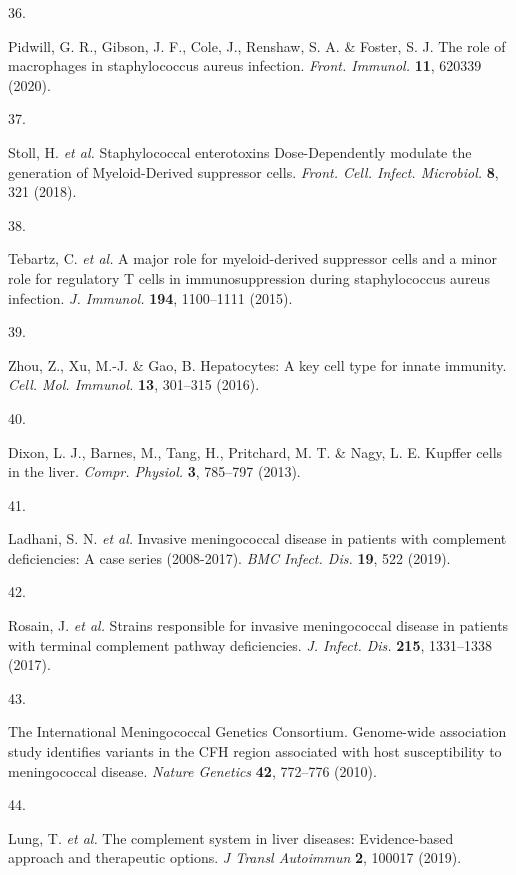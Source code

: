 \documentclass[
]{report}
\newlength{\cslhangindent}
\newlength{\csllabelwidth}
\newenvironment{CSLReferences}[2] %
 {\begin{list}{}{%
  \setlength{\itemindent}{0pt}
  \setlength{\leftmargin}{0pt}
  \setlength{\parsep}{0pt}
  \ifodd #1
   \setlength{\leftmargin}{\cslhangindent}
   \setlength{\itemindent}{-1\cslhangindent}
  \fi
  \setlength{\itemsep}{#2\baselineskip}}}
 {\end{list}}
\newcommand{\CSLLeftMargin}[1]{\parbox[t]{\csllabelwidth}{\strut#1\strut}}
\newcommand{\CSLRightInline}[1]{\parbox[t]{\linewidth - \csllabelwidth}{\strut#1\strut}}
\begin{document}
\begin{CSLReferences}{0}{0}
\CSLLeftMargin{36. }%
\CSLRightInline{Pidwill, G. R., Gibson, J. F., Cole, J., Renshaw, S. A.
\& Foster, S. J. The role of macrophages in staphylococcus aureus
infection. \emph{Front. Immunol.} \textbf{11}, 620339 (2020).}

\CSLLeftMargin{37. }%
\CSLRightInline{Stoll, H. \emph{et al.} Staphylococcal enterotoxins
{Dose-Dependently} modulate the generation of {Myeloid-Derived}
suppressor cells. \emph{Front. Cell. Infect. Microbiol.} \textbf{8}, 321
(2018).}

\CSLLeftMargin{38. }%
\CSLRightInline{Tebartz, C. \emph{et al.} A major role for
myeloid-derived suppressor cells and a minor role for regulatory {T}
cells in immunosuppression during staphylococcus aureus infection.
\emph{J. Immunol.} \textbf{194}, 1100--1111 (2015).}

\CSLLeftMargin{39. }%
\CSLRightInline{Zhou, Z., Xu, M.-J. \& Gao, B. Hepatocytes: A key cell
type for innate immunity. \emph{Cell. Mol. Immunol.} \textbf{13},
301--315 (2016).}

\CSLLeftMargin{40. }%
\CSLRightInline{Dixon, L. J., Barnes, M., Tang, H., Pritchard, M. T. \&
Nagy, L. E. Kupffer cells in the liver. \emph{Compr. Physiol.}
\textbf{3}, 785--797 (2013).}

\CSLLeftMargin{41. }%
\CSLRightInline{Ladhani, S. N. \emph{et al.} Invasive meningococcal
disease in patients with complement deficiencies: A case series
(2008-2017). \emph{BMC Infect. Dis.} \textbf{19}, 522 (2019).}

\CSLLeftMargin{42. }%
\CSLRightInline{Rosain, J. \emph{et al.} Strains responsible for
invasive meningococcal disease in patients with terminal complement
pathway deficiencies. \emph{J. Infect. Dis.} \textbf{215}, 1331--1338
(2017).}

\CSLLeftMargin{43. }%
\CSLRightInline{The International Meningococcal Genetics Consortium.
Genome-wide association study identifies variants in the {CFH} region
associated with host susceptibility to meningococcal disease.
\emph{Nature Genetics} \textbf{42}, 772--776 (2010).}

\CSLLeftMargin{44. }%
\CSLRightInline{Lung, T. \emph{et al.} The complement system in liver
diseases: Evidence-based approach and therapeutic options. \emph{J
Transl Autoimmun} \textbf{2}, 100017 (2019).}


\end{CSLReferences}
\end{document}
